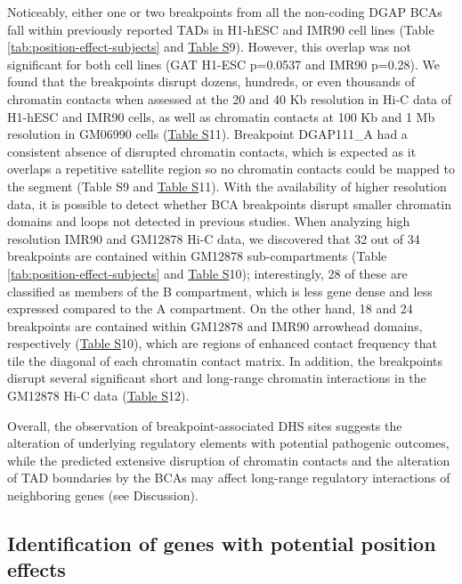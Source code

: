 \documentclass[a4paper,twoside=true,openright,parskip=full,chapterprefix=true,11pt,headings=normal,bibliography=totoc,listof=totoc,titlepage=on,captions=tableabove,draft=false]{scrreprt}
\theoremstyle{definition}
\theoremstyle{definition}
\theoremstyle{definition}
\theoremstyle{remark}
\begin{document}
Noticeably, either one or two breakpoints from all the non-coding DGAP
BCAs fall within previously reported TADs in H1-hESC and IMR90 cell
lines (Table \ref{tab:position-effect-subjects} and
\protect\hyperlink{position-effect-sub-tab}{Table S}9).\citep{Dixon2012}
However, this overlap was not significant for both cell lines (GAT
H1-ESC p=0.0537 and IMR90 p=0.28). We found that the breakpoints disrupt
dozens, hundreds, or even thousands of chromatin contacts when assessed
at the 20 and 40 Kb resolution in Hi-C data of H1-hESC and IMR90 cells,
as well as chromatin contacts at 100 Kb and 1 Mb resolution in GM06990
cells (\protect\hyperlink{position-effect-sub-tab}{Table S}11).
Breakpoint DGAP111\_A had a consistent absence of disrupted chromatin
contacts, which is expected as it overlaps a repetitive satellite region
so no chromatin contacts could be mapped to the segment (Table S9 and
\protect\hyperlink{position-effect-sub-tab}{Table S}11). With the
availability of higher resolution data, it is possible to detect whether
BCA breakpoints disrupt smaller chromatin domains and loops not detected
in previous studies. When analyzing high resolution IMR90 and GM12878
Hi-C data,\citep{Rao2014} we discovered that 32 out of 34 breakpoints
are contained within GM12878 sub-compartments (Table
\ref{tab:position-effect-subjects} and
\protect\hyperlink{position-effect-sub-tab}{Table S}10); interestingly,
28 of these are classified as members of the B compartment, which is
less gene dense and less expressed compared to the A compartment. On the
other hand, 18 and 24 breakpoints are contained within GM12878 and IMR90
arrowhead domains, respectively
(\protect\hyperlink{position-effect-sub-tab}{Table S}10), which are
regions of enhanced contact frequency that tile the diagonal of each
chromatin contact matrix. In addition, the breakpoints disrupt several
significant short and long-range chromatin interactions in the GM12878
Hi-C data (\protect\hyperlink{position-effect-sub-tab}{Table S}12).

Overall, the observation of breakpoint-associated DHS sites suggests the
alteration of underlying regulatory elements with potential pathogenic
outcomes, while the predicted extensive disruption of chromatin contacts
and the alteration of TAD boundaries by the BCAs may affect long-range
regulatory interactions of neighboring genes (see Discussion).

\hypertarget{identification-of-genes-with-potential-position-effects}{%
\subsection{Identification of genes with potential position
effects}\label{identification-of-genes-with-potential-position-effects}}
\end{document}
